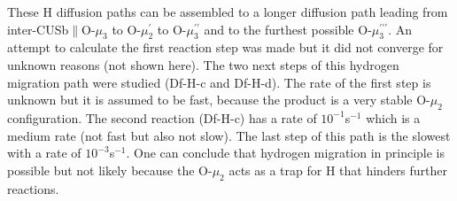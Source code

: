\documentclass[11pt,DIV=13,BCOR=5mm,a4paper,headinclude]{scrbook}
\begin{document}
These H diffusion paths can be assembled to a longer diffusion path leading from inter-CUSb$\parallel$O-$\mu_3$ to O-$\mu_2^\prime$ to O-$\mu_3^{\prime\prime}$ and to the furthest possible O-$\mu_3^{\prime\prime\prime}$.
An attempt to calculate the first reaction step was made but it did not converge for unknown reasons (not shown here).
The two next steps of this hydrogen migration path were studied (Df-H-c and Df-H-d).
The rate of the first step is unknown but it is assumed to be fast, because the product is a very stable O-$\mu_2$ configuration.
The second reaction (Df-H-c) has a rate of $10^{-1}$s$^{-1}$ which is a medium rate (not fast but also not slow).
The last step of this path is the slowest with a rate of $10^{-3}$s$^{-1}$.
One can conclude that hydrogen migration in principle is possible but not likely because the O-$\mu_2$ acts as a trap for H that hinders further reactions.
\end{document}
